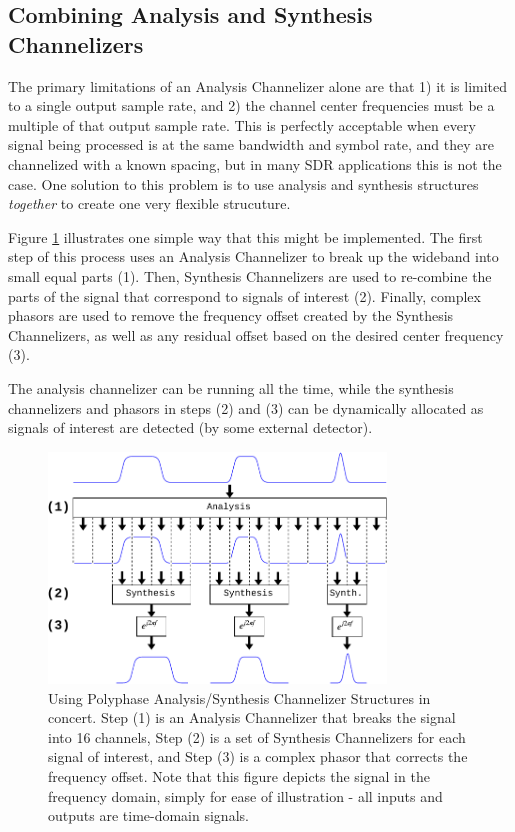 \documentclass[12pt]{report}
\begin{document}
\subsection{Combining Analysis and Synthesis Channelizers}
\label{sec:combine_analysis_synthesis}
The primary limitations of an Analysis Channelizer alone are that 1) it is limited
to a single output sample rate, and 2) the channel center frequencies must be
a multiple of that output sample rate. This is perfectly acceptable when every
signal being processed is at the same bandwidth and symbol rate, and they are
channelized with a known spacing, but in many SDR applications this is not the
case. One solution to this problem is to use analysis and synthesis structures
\emph{together} to create one very flexible strucuture.

Figure \ref{fig:analysis_and_synthesis} illustrates one simple way that this
might be implemented. The first step of this process uses an Analysis
Channelizer to break up the wideband into small equal parts (1). Then,
Synthesis Channelizers are used to re-combine the parts of the signal that
correspond to signals of interest (2). Finally, complex phasors are used to
remove the frequency offset created by the Synthesis Channelizers, as well as
any residual offset based on the desired center frequency (3).

The analysis channelizer can be running all the time, while the synthesis
channelizers and phasors in steps (2) and (3) can be dynamically allocated as
signals of interest are detected (by some external detector).

\begin{figure}[h!]
    \begin{center}
    \includegraphics[width=0.8\textwidth]{polyphase}%
    \end{center}
    \caption{
Using Polyphase Analysis/Synthesis Channelizer Structures in concert. Step (1)
is an Analysis Channelizer that breaks the signal into 16 channels, Step (2) is
a set of Synthesis Channelizers for each signal of interest, and Step (3) is
a complex phasor that corrects the frequency offset. Note that this figure
depicts the signal in the frequency domain, simply for ease of illustration -
all inputs and outputs are time-domain signals.
    }
    \label{fig:analysis_and_synthesis}
\end{figure}
\end{document}
